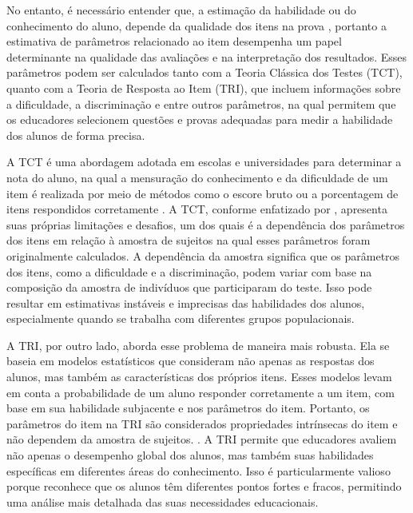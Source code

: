 No entanto, é necessário entender que, a estimação da habilidade ou do conhecimento do aluno, depende da qualidade dos itens na prova \cite{BORGATTO2012}, portanto a estimativa de parâmetros relacionado ao item desempenha um papel determinante na qualidade das avaliações e na interpretação dos resultados. Esses parâmetros podem ser calculados tanto com a Teoria Clássica dos Testes (TCT), quanto com a Teoria de Resposta ao Item (TRI), que incluem informações sobre a dificuldade, a discriminação e entre outros parâmetros, na qual permitem que os educadores selecionem questões e provas adequadas para medir a habilidade dos alunos de forma precisa. 

A TCT é uma abordagem adotada em escolas e universidades para determinar a nota do aluno, na qual a mensuração do conhecimento e da dificuldade de um item é realizada por meio de métodos como o escore bruto ou a porcentagem de itens respondidos corretamente \cite{pasquali2003}. A TCT, conforme enfatizado por , apresenta suas próprias limitações e desafios, um dos quais é a dependência dos parâmetros dos itens em relação à amostra de sujeitos na qual esses parâmetros foram originalmente calculados. A dependência da amostra significa que os parâmetros dos itens, como a dificuldade e a discriminação, podem variar com base na composição da amostra de indivíduos que participaram do teste. Isso pode resultar em estimativas instáveis e imprecisas das habilidades dos alunos, especialmente quando se trabalha com diferentes grupos populacionais.

\begin{comment}
	 É importante ressaltar que, de acordo com Pasquali (2003), a TCT não mede diretamente o traço latente e sim avalia o comportamento observado dos alunos em relação aos itens.
\end{comment}


A TRI, por outro lado, aborda esse problema de maneira mais robusta. Ela se baseia em modelos estatísticos que consideram não apenas as respostas dos alunos, mas também as características dos próprios itens. Esses modelos levam em conta a probabilidade de um aluno responder corretamente a um item, com base em sua habilidade subjacente e nos parâmetros do item. Portanto, os parâmetros do item na TRI são considerados propriedades intrínsecas do item e não dependem da amostra de sujeitos. \cite{pasquali2018}. A TRI permite que educadores avaliem não apenas o desempenho global dos alunos, mas também suas habilidades específicas em diferentes áreas do conhecimento. Isso é particularmente valioso porque reconhece que os alunos têm diferentes pontos fortes e fracos, permitindo uma análise mais detalhada das suas necessidades educacionais. 

